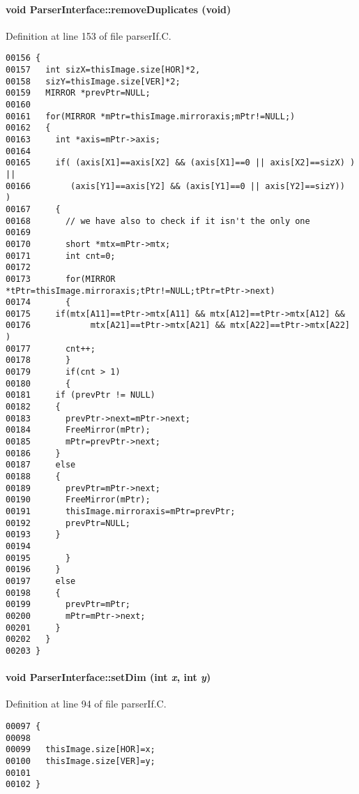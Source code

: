 \paragraph{\setlength{\rightskip}{0pt plus 5cm}void Parser\-Interface::remove\-Duplicates (void)\hspace{0.3cm}{\tt  [private]}}\hfill



Definition at line 153 of file parser\-If.C.\small\begin{verbatim}00156 {
00157   int sizX=thisImage.size[HOR]*2,
00158   sizY=thisImage.size[VER]*2;
00159   MIRROR *prevPtr=NULL;
00160   
00161   for(MIRROR *mPtr=thisImage.mirroraxis;mPtr!=NULL;)
00162   {
00163     int *axis=mPtr->axis;
00164     
00165     if( (axis[X1]==axis[X2] && (axis[X1]==0 || axis[X2]==sizX) ) ||
00166        (axis[Y1]==axis[Y2] && (axis[Y1]==0 || axis[Y2]==sizY))    )
00167     {
00168       // we have also to check if it isn't the only one
00169       
00170       short *mtx=mPtr->mtx;
00171       int cnt=0;
00172       
00173       for(MIRROR *tPtr=thisImage.mirroraxis;tPtr!=NULL;tPtr=tPtr->next)
00174       {
00175     if(mtx[A11]==tPtr->mtx[A11] && mtx[A12]==tPtr->mtx[A12] &&
00176            mtx[A21]==tPtr->mtx[A21] && mtx[A22]==tPtr->mtx[A22] )
00177       cnt++;
00178       }
00179       if(cnt > 1)
00180       {
00181     if (prevPtr != NULL)
00182     {
00183       prevPtr->next=mPtr->next;
00184       FreeMirror(mPtr);
00185       mPtr=prevPtr->next;
00186     }
00187     else
00188     {
00189       prevPtr=mPtr->next;
00190       FreeMirror(mPtr);
00191       thisImage.mirroraxis=mPtr=prevPtr;
00192       prevPtr=NULL;
00193     }
00194     
00195       }
00196     }
00197     else
00198     {
00199       prevPtr=mPtr;
00200       mPtr=mPtr->next;
00201     }
00202   }
00203 }
\end{verbatim}\normalsize 
\label{ParserInterface_a5}
\paragraph{\setlength{\rightskip}{0pt plus 5cm}void Parser\-Interface::set\-Dim (int {\em x}, int {\em y})}\hfill



Definition at line 94 of file parser\-If.C.\small\begin{verbatim}00097 {
00098 
00099   thisImage.size[HOR]=x;
00100   thisImage.size[VER]=y;
00101 
00102 }
\end{verbatim}\normalsize 
\label{ParserInterface_a10}
